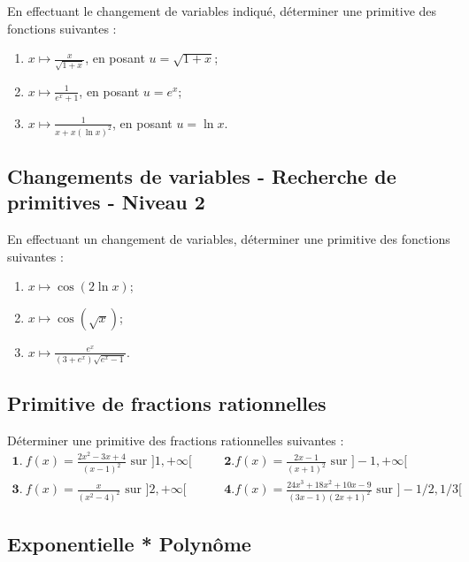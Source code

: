 En effectuant le changement de variables indiqué, déterminer une primitive des fonctions suivantes :
\begin{enumerate}
\item $\displaystyle x\mapsto \frac{x}{\sqrt{1+x}}$, en posant $u=\sqrt{1+x}$;
\item $\displaystyle x\mapsto \frac{1}{e^x+1}$, en posant $u=e^x$;
\item $\displaystyle x\mapsto \frac{1}{x+x(\ln x)^2}$, en posant $u=\ln x$.
\end{enumerate}




\vspace{1em}
\subsection{Changements de variables - Recherche de primitives - Niveau 2}

En effectuant un changement de variables, déterminer une primitive des fonctions suivantes :
\begin{enumerate}
\item $\displaystyle x\mapsto \cos(2\ln x)$;
\item $\displaystyle x\mapsto\cos(\sqrt x)$;
\item $\displaystyle x\mapsto \frac{e^x}{(3+e^x)\sqrt{e^x-1}}$.
\end{enumerate}




\vspace{1em}
\subsection{Primitive de fractions rationnelles}

Déterminer une primitive des fractions rationnelles suivantes :
$$
\begin{array}{lll}
\mathbf 1.\ f(x)=\frac{2x^2-3x+4}{(x-1)^2}\textrm{ sur }]1,+\infty[&\quad&\mathbf 2. f(x)=\frac{2x-1}{(x+1)^2}\textrm{ sur }]-1,+\infty[ \\
\mathbf 3.\ f(x)=\frac{x}{(x^2-4)^2}\textrm{ sur }]2,+\infty[&&\mathbf 4. f(x)=\frac{24x^3+18x^2+10x-9}{(3x-1)(2x+1)^2}\textrm{ sur }]-1/2,1/3[
\end{array}
$$




\vspace{1em}
\subsection{Exponentielle * Polynôme}

